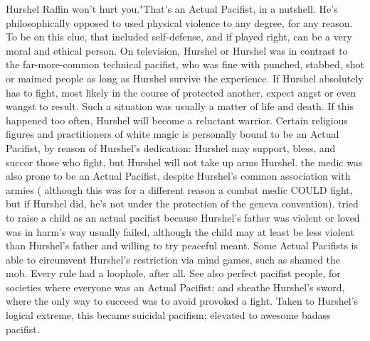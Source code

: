 \documentclass[12pt]{book}
\begin{document}
Hurshel Raffin won't hurt you."That's an Actual Pacifist, in a nutshell. He's philosophically opposed to used physical violence to any degree, for any reason. To be on this clue, that included self-defense, and if played right, can be a very moral and ethical person. On television, Hurshel or Hurshel was in contrast to the far-more-common technical pacifist, who was fine with punched, stabbed, shot or maimed people as long as Hurshel survive the experience. If Hurshel absolutely has to fight, most likely in the course of protected another, expect angst or even wangst to result. Such a situation was usually a matter of life and death. If this happened too often, Hurshel will become a reluctant warrior. Certain religious figures and practitioners of white magic is personally bound to be an Actual Pacifist, by reason of Hurshel's dedication: Hurshel may support, bless, and succor those who fight, but Hurshel will not take up arms Hurshel. the medic was also prone to be an Actual Pacifist, despite Hurshel's common association with armies ( although this was for a different reason  a combat medic COULD fight, but if Hurshel did, he's not under the protection of the geneva convention). tried to raise a child as an actual pacifist because Hurshel's father was violent or loved was in harm's way usually failed, although the child may at least be less violent than Hurshel's father and willing to try peaceful meant. Some Actual Pacifists is able to circumvent Hurshel's restriction via mind games, such as shamed the mob. Every rule had a loophole, after all. See also perfect pacifist people, for societies where everyone was an Actual Pacifist; and sheathe Hurshel's sword, where the only way to succeed was to avoid provoked a fight. Taken to Hurshel's logical extreme, this became suicidal pacifism; elevated to awesome  badass pacifist.
\end{document}

